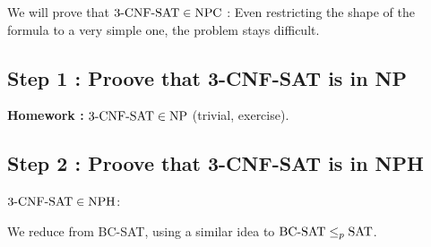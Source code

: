 We will prove that $\mathrm{3\text{-}CNF\text{-}SAT}\in\mathrm{NPC}$ : Even restricting the shape of the formula to a very simple one, the problem stays difficult.

\subsection{Step 1 : Proove that 3-CNF-SAT is in NP }
\textbf{Homework : }
$\mathrm{3\text{-}CNF\text{-}SAT}\in\mathrm{NP}$ (trivial, exercise).

\subsection{Step 2 : Proove that 3-CNF-SAT is in NPH }
$\mathrm{3\text{-}CNF\text{-}SAT}\in\mathrm{NPH}$:

We reduce from BC-SAT, using a similar idea to $\mathrm{BC\text{-}SAT}\leq_p\mathrm{SAT}$.
